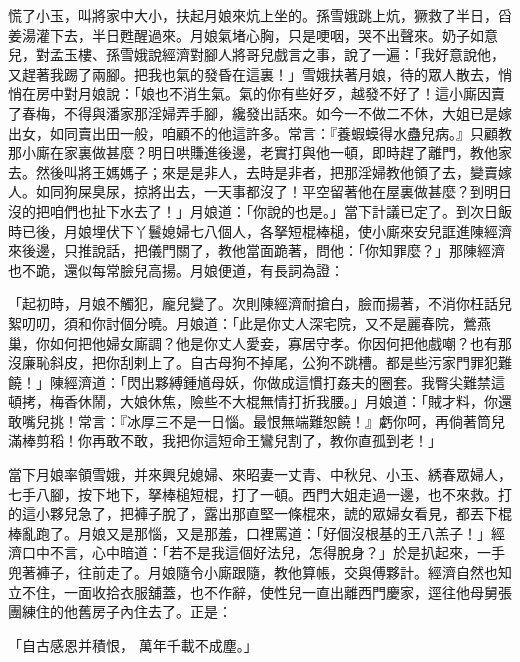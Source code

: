 慌了小玉，叫將家中大小，扶起月娘來炕上坐的。孫雪娥跳上炕，獗救了半日，舀姜湯灌下去，半日甦醒過來。月娘氣堵心胸，只是哽咽，哭不出聲來。奶子如意兒，對孟玉樓、孫雪娥說經濟對腳人將哥兒戲言之事，說了一遍：「我好意說他，又趕著我踢了兩腳。把我也氣的發昏在這裏！」雪娥扶著月娘，待的眾人散去，悄悄在房中對月娘說：「娘也不消生氣。氣的你有些好歹，越發不好了！這小廝因賣了春梅，不得與潘家那淫婦弄手腳，纔發出話來。如今一不做二不休，大姐已是嫁出女，如同賣出田一般，咱顧不的他這許多。常言：『養蝦蟆得水蠱兒病。』只顧教那小廝在家裏做甚麼？明日哄賺進後邊，老實打與他一頓，即時趕了離門，教他家去。然後叫將王媽媽子；來是是非人，去時是非者，把那淫婦教他領了去，變賣嫁人。如同狗屎臭尿，掠將出去，一天事都沒了！平空留著他在屋裏做甚麼？到明日沒的把咱們也扯下水去了！」月娘道：「你說的也是。」當下計議已定了。到次日飯時已後，月娘埋伏下丫鬟媳婦七八個人，各拏短棍棒槌，使小廝來安兒誆進陳經濟來後邊，只推說話，把儀門關了，教他當面跪著，問他：「你知罪麼？」那陳經濟也不跪，還似每常臉兒高揚。月娘便道，有長詞為證：

「起初時，月娘不觸犯，龐兒變了。次則陳經濟耐搶白，臉而揚著，不消你枉話兒絮叨叨，須和你討個分曉。月娘道：「此是你丈人深宅院，又不是麗春院，鶯燕巢，你如何把他婦女廝調？他是你丈人愛妾，寡居守孝。你因何把他戲嘲？也有那沒廉恥斜皮，把你刮剌上了。自古母狗不掉尾，公狗不跳槽。都是些污家門罪犯難饒！」陳經濟道：「閃出夥縛鍾馗母妖，你做成這慣打姦夫的圈套。我臀尖難禁這頓拷，梅香休鬧，大娘休焦，險些不大棍無情打折我腰。」月娘道：「賊才料，你還敢嘴兒挑！常言：『冰厚三不是一日惱。最恨無端難恕饒！』虧你呵，再倘著筒兒滿棒剪稻！你再敢不敢，我把你這短命王鸞兒割了，教你直孤到老！」

當下月娘率領雪娥，并來興兒媳婦、來昭妻一丈青、中秋兒、小玉、綉春眾婦人，七手八腳，按下地下，拏棒槌短棍，打了一頓。西門大姐走過一邊，也不來救。打的這小夥兒急了，把褲子脫了，露出那直堅一條棍來，諕的眾婦女看見，都丟下棍棒亂跑了。月娘又是那惱，又是那羞，口裡罵道：「好個沒根基的王八羔子！」經濟口中不言，心中暗道：「若不是我這個好法兒，怎得脫身？」於是扒起來，一手兜著褲子，往前走了。月娘隨令小廝跟隨，教他算帳，交與傅夥計。經濟自然也知立不住，一面收拾衣服舖蓋，也不作辭，使性兒一直出離西門慶家，逕往他母舅張團練住的他舊房子內住去了。正是：

「自古感恩并積恨，  萬年千載不成塵。」

